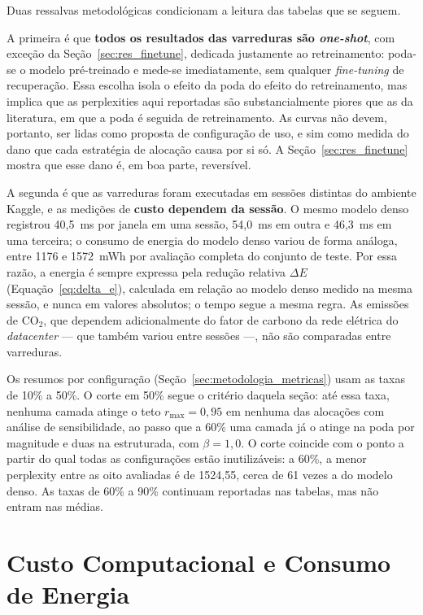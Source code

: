 Duas ressalvas metodológicas condicionam a leitura das tabelas que se seguem.

A primeira é que \textbf{todos os resultados das varreduras são
\textit{one-shot}}, com exceção da Seção~\ref{sec:res_finetune}, dedicada
justamente ao retreinamento: poda-se o modelo pré-treinado e mede-se imediatamente, sem
qualquer \textit{fine-tuning} de recuperação. Essa escolha isola o efeito da
poda do efeito do retreinamento, mas implica que as perplexities aqui
reportadas são substancialmente piores que as da literatura, em que a poda é
seguida de retreinamento. As curvas não devem, portanto, ser lidas como
proposta de configuração de uso, e sim como medida do dano que cada estratégia
de alocação causa por si só. A Seção~\ref{sec:res_finetune} mostra que esse
dano é, em boa parte, reversível.

A segunda é que as varreduras foram executadas em sessões distintas do
ambiente Kaggle, e as medições de \textbf{custo dependem da sessão}. O mesmo
modelo denso registrou 40,5~ms por janela em uma sessão, 54,0~ms em outra e
46,3~ms em uma terceira; o consumo de energia do modelo denso variou de
forma análoga, entre 1176 e 1572~mWh por avaliação completa do conjunto de teste. Por
essa razão, a energia é sempre expressa pela redução relativa $\Delta E$
(Equação~\ref{eq:delta_e}), calculada em relação ao modelo denso medido na mesma sessão,
e nunca em valores absolutos; o tempo segue a mesma regra. As emissões de
$\text{CO}_2$, que dependem adicionalmente do fator de carbono da rede elétrica do
\textit{datacenter} --- que também variou entre sessões ---, não são comparadas entre
varreduras.

Os resumos por configuração (Seção~\ref{sec:metodologia_metricas}) usam as taxas de
10\% a 50\%. O corte em 50\% segue o critério daquela seção: até essa taxa, nenhuma
camada atinge o teto $r_{\max} = 0{,}95$ em nenhuma das alocações com análise de
sensibilidade, ao passo que a 60\% uma camada já o atinge na poda por magnitude e duas na
estruturada, com $\beta = 1{,}0$. O corte coincide com o ponto a partir do qual todas as
configurações estão inutilizáveis: a 60\%, a menor perplexity entre as oito avaliadas é de
1524,55, cerca de 61 vezes a do modelo denso. As taxas de 60\% a 90\% continuam reportadas
nas tabelas, mas não entram nas médias.

\section{Custo Computacional e Consumo de Energia}\label{sec:res_custo}


